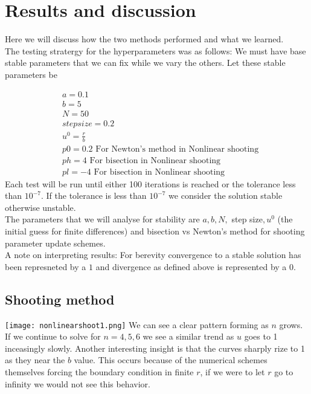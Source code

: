 \documentclass{article}
\begin{document}
\section{Results and discussion}
Here we will discuss how the two methods performed and what we learned. \\
The testing stratergy for the hyperparameters was as follows: We must have base stable parameters that we can fix while we vary the others. Let these stable parameters be

\begin{align*}
 & a = 0.1 \\
 & b = 5 \\
 & N = 50 \\
 & step size = 0.2 \\
 & u^0 = \frac{r}{b} \\
 & p0 = 0.2 \text{ \ \ \ For Newton's method in Nonlinear   shooting}\\
 & ph = 4 \text{ \ \ \ \ \ For bisection in Nonlinear shooting}\\
 & pl = -4 \text{ \ \ \ For bisection in Nonlinear shooting}
\end{align*}
Each test will be run until either 100 iterations is reached or the tolerance less than $10^{-7}$. If the tolerance is less than $10^{-7}$ we consider the solution stable otherwise unstable.  \\
The parameters that we will analyse for stability are $a,b,N,$ step size$,u^0$ (the initial guess for finite differences) and bisection vs Newton's method for shooting parameter update schemes. \\
A note on interpreting results: For berevity convergence to a stable solution has been represneted by a $1$ and divergence as defined above is represented by a $0$.  
\subsection{Shooting method}
\texttt{[image: nonlinearshoot1.png]}
We can see a clear pattern forming as $n$ grows. If we continue to solve for $n=4,5,6$ we see a similar trend as $u$ goes to 1 inceasingly slowly. Another interesting insight is that the curves sharply rize to 1 as they near the $b$ value. This occurs because of the numerical schemes themselves forcing the boundary condition in finite $r$, if we were to let $r$ go to infinity we would not see this behavior. \\
\end{document}
